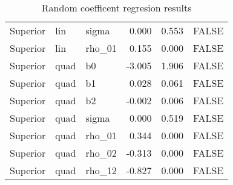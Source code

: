 \begin{table}[ht]
\begin{center}
\begin{tabular}{lllrrl}
  Superior & lin & sigma & 0.000 & 0.553 & FALSE \\ 
  Superior & lin & rho\_01 & 0.155 & 0.000 & FALSE \\ 
  Superior & quad & b0 & -3.005 & 1.906 & FALSE \\ 
  Superior & quad & b1 & 0.028 & 0.061 & FALSE \\ 
  Superior & quad & b2 & -0.002 & 0.006 & FALSE \\ 
  Superior & quad & sigma & 0.000 & 0.519 & FALSE \\ 
  Superior & quad & rho\_01 & 0.344 & 0.000 & FALSE \\ 
  Superior & quad & rho\_02 & -0.313 & 0.000 & FALSE \\ 
  Superior & quad & rho\_12 & -0.827 & 0.000 & FALSE \\ 
   \hline
\end{tabular}
\caption{Random coefficent regresion results}
\end{center}
\end{table}
